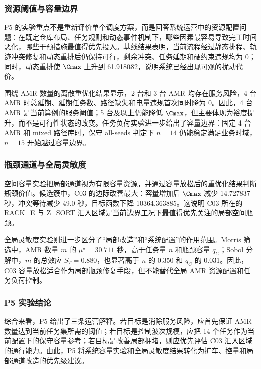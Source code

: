 \subsubsection{资源阈值与容量边界}

P5 的实验重点不是重新评价单个调度方案，而是回答系统运营中的资源配置问题：在既定仓库布局、任务规则和动态事件机制下，哪些因素最容易导致完工时间恶化，哪些干预措施最值得优先投入。基线结果表明，当前流程经过静态排程、轨迹冲突修复和动态重排后仍保持可行，剩余冲突、任务延期和硬约束违规均为 0；同时，动态重排使 $\Cmax$ 上升到 61.918082，说明系统已经出现可观的扰动代价。

围绕 AMR 数量的离散重优化结果显示，2 台和 3 台 AMR 均存在服务风险，4 台 AMR 时总延期、延期任务数、路径缺失和电量违规首次同时降为 0。因此，4 台 AMR 是当前算例的服务阈值；5 台及以上仍能降低 $\Cmax$，但主要体现为裕度提升，而不是可行性状态的改变。任务负荷实验进一步给出了容量边界：固定 4 台 AMR 和 mixed 路径库时，保守 all-seeds 判定下 $n=14$ 仍能稳定满足业务时域，$n=15$ 开始越过容量边界。

\subsubsection{瓶颈通道与全局灵敏度}

空间容量实验把局部通道视为有限容量资源，并通过容量放松后的重优化结果判断瓶颈价值。候选簇中，C03 的边际改善最大：容量增加后 $\Cmax$ 减少 14.727837 秒，冲突等待减少 49.0 秒，目标函数下降 10364.363885。这说明 C03 所在的 RACK\_E 与 Z\_SORT 汇入区域是当前边界工况下最值得优先关注的局部空间瓶颈。

全局灵敏度实验则进一步区分了“局部改造”和“系统配置”的作用范围。Morris 筛选中，AMR 数量 $m$ 的 $\mu^\star=30.711$ 秒，高于任务量 $n$ 和瓶颈容量 $q_C$；Sobol 分解中，$m$ 的总效应 $S_T=0.880$，也显著高于 $n$ 的 0.350 和 $q_C$ 的 0.031。因此，C03 容量放松适合作为局部瓶颈修复手段，但不能替代全局 AMR 资源配置和任务负荷控制。

\subsubsection{P5 实验结论}

综合来看，P5 给出了三条运营解释。若目标是消除服务风险，应首先保证 AMR 数量达到当前任务集所需的阈值；若目标是控制波次规模，应把 14 个任务作为当前配置下的保守容量参考；若目标是改善局部拥堵，则应优先评估 C03 汇入区域的通行能力。由此，P5 将系统容量实验和全局灵敏度结果转化为扩车、控量和局部通道改造的优先级建议。
